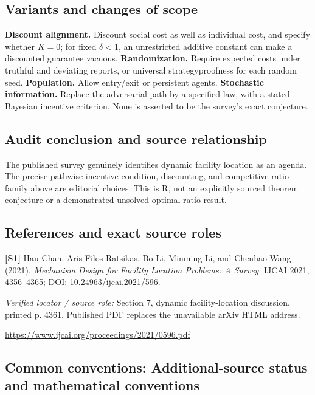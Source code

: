 \documentclass[11pt,a4paper]{article}
\begin{document}
\subsection*{Variants and changes of scope}

\textbf{Discount alignment.} Discount social cost as well as individual cost, and specify whether $K=0$; for fixed $\delta<1$, an unrestricted additive constant can make a discounted guarantee vacuous. \textbf{Randomization.} Require expected costs under truthful and deviating reports, or universal strategyproofness for each random seed. \textbf{Population.} Allow entry/exit or persistent agents. \textbf{Stochastic information.} Replace the adversarial path by a specified law, with a stated Bayesian incentive criterion. None is asserted to be the survey's exact conjecture.

\subsection*{Audit conclusion and source relationship}

The published survey genuinely identifies dynamic facility location as an agenda. The precise pathwise incentive condition, discounting, and competitive-ratio family above are editorial choices. This is R, not an explicitly sourced theorem conjecture or a demonstrated unsolved optimal-ratio result.

\subsection*{References and exact source roles}

{\footnotesize\raggedright
\par\noindent\textbf{[S1]} Hau Chan, Aris Filos-Ratsikas, Bo Li, Minming Li, and Chenhao Wang (2021). \emph{Mechanism Design for Facility Location Problems: A Survey}. IJCAI 2021, 4356--4365; DOI: 10.24963/ijcai.2021/596.\par \textit{Verified locator / source role:} Section 7, dynamic facility-location discussion, printed p. 4361. Published PDF replaces the unavailable arXiv HTML address.\par \url{https://www.ijcai.org/proceedings/2021/0596.pdf}\par\smallskip
}

\subsection*{Common conventions: Additional-source status and mathematical conventions}
\end{document}
